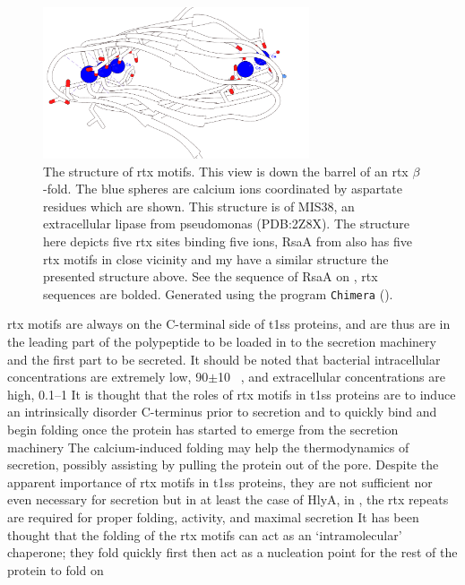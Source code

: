   
  \begin{figure}[htb]
    \begin{center}
      \includegraphics[width=0.7\textwidth]{intro/img/rtx-white.png}
    \end{center}

    \caption[The structure of \ac{rtx} motifs]{The structure of \ac{rtx} motifs. This view is down the barrel of an \ac{rtx} $\beta$-fold. The blue spheres are calcium ions coordinated by aspartate residues which are shown. This structure is of MIS38, an extracellular lipase from \ac{pseudomonas} (PDB:2Z8X). The structure here depicts five \ac{rtx} sites binding five  ions, RsaA from \caulobacter also has five \ac{rtx} motifs in close vicinity and my have a similar structure the presented structure above. See the sequence of RsaA on , \ac{rtx} sequences are bolded. Generated using the program \texttt{Chimera} ().
    }
    \label{fig:intro-rtx}
  \end{figure}   

  \ac{rtx} motifs are always on the C-terminal side of \ac{t1ss} proteins, and are thus are in the leading part of the polypeptide to be loaded in to the secretion machinery and the first part to be secreted. It should be noted that bacterial intracellular  concentrations are extremely low, 90$\pm$10 \si{\nano\molar}, and extracellular  concentrations are high, 0.1--1 \millimolar{} It is thought that the roles of \ac{rtx} motifs in \ac{t1ss} proteins are to induce an intrinsically disorder C-terminus prior to secretion and to quickly  bind  and begin folding once the protein has started to emerge from the secretion machinery The calcium-induced folding may help the thermodynamics of secretion, possibly assisting by pulling the protein out of the pore.  Despite the apparent importance of \ac{rtx} motifs in \ac{t1ss} proteins, they are not sufficient nor even necessary for secretion but in at least the case of HlyA, in \ecoli, the \ac{rtx} repeats are required for proper folding, activity, and maximal secretion It has been thought that the folding of the \ac{rtx} motifs can act as an `intramolecular' chaperone; they fold quickly first then act as a nucleation point for the rest of the protein to fold on 


